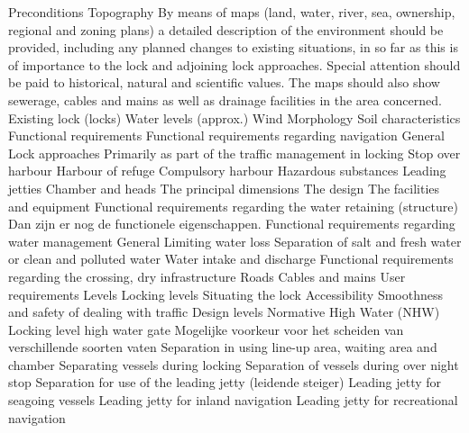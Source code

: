Preconditions
Topography
By means of maps (land, water, river, sea, ownership, regional and zoning plans) a detailed description
of the environment should be provided, including any planned changes to existing situations, in so far
as this is of importance to the lock and adjoining lock approaches. Special attention should be paid to
historical, natural and scientific values. The maps should also show sewerage, cables and mains as well
as drainage facilities in the area concerned.
Existing lock (locks)
Water levels (approx.)
Wind
Morphology
Soil characteristics
Functional requirements
Functional requirements regarding navigation
General
Lock approaches
Primarily as part of the traffic management in locking
Stop over harbour
Harbour of refuge
Compulsory harbour
Hazardous substances
Leading jetties
Chamber and heads
The principal dimensions
The design
The facilities and equipment
Functional requirements regarding the water retaining (structure)
\newline \indent Dan zijn er nog de functionele eigenschappen.
 Functional requirements regarding water management
General
Limiting water loss
Separation of salt and fresh water or clean and polluted water
Water intake and discharge
\newline \indent Functional requirements regarding the crossing, dry infrastructure
Roads
Cables and mains
\newline \indent  User requirements
\newline \indent Levels
Locking levels
Situating the lock
Accessibility
Smoothness and safety of dealing with traffic
Design levels
Normative High Water (NHW)
Locking level high water gate
\newline \indent Mogelijke voorkeur voor het scheiden van verschillende soorten vaten
Separation in using line-up area, waiting area and chamber
Separating vessels during locking
Separation of vessels during over night stop
Separation for use of the leading jetty (leidende steiger)
Leading jetty for seagoing vessels
Leading jetty for inland navigation
Leading jetty for recreational navigation
